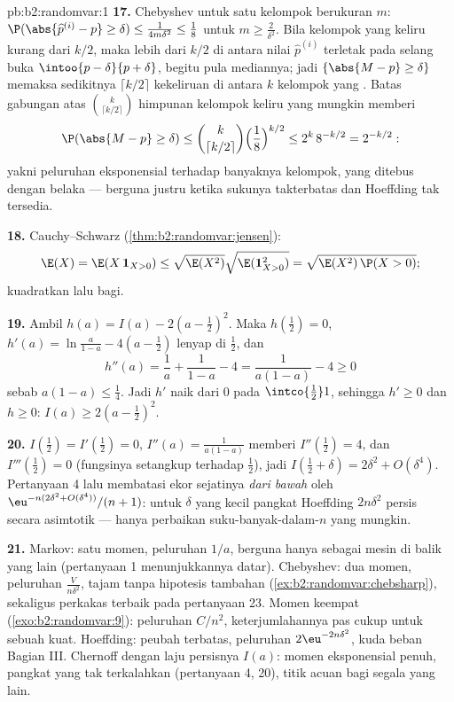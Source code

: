 \begin{solution}{pb:b2:randomvar:1}
\textbf{17.} Chebyshev untuk satu kelompok berukuran $m$: $\P(\abs{
\widehat p^{(i)} - p} \geq \delta) \leq \frac{1}{4m\delta^2}
\leq \frac18$ untuk $m \geq \frac2{\delta^2}$. Bila kelompok yang keliru
kurang dari $k/2$, maka lebih dari $k/2$ di antara nilai
$\widehat p^{(i)}$ terletak pada selang buka $\intoo{p -
\delta}{p + \delta}$, begitu pula mediannya; jadi
$\{\abs{M - p} \geq \delta\}$ memaksa sedikitnya $\lceil
k/2\rceil$ kekeliruan di antara $k$ kelompok yang . Batas
gabungan atas $\binom k{\lceil k/2\rceil}$ himpunan kelompok
keliru yang mungkin memberi
\[
\P(\abs{M - p} \geq \delta)
\leq \binom{k}{\lceil k/2\rceil}
\Bigl(\frac18\Bigr)^{k/2}
\leq 2^k\,8^{-k/2} = 2^{-k/2} :
\]
yakni peluruhan eksponensial terhadap banyaknya kelompok, yang ditebus
dengan  belaka --- berguna justru ketika sukunya
takterbatas dan Hoeffding tak tersedia.

\textbf{18.} Cauchy--Schwarz
(\cref{thm:b2:randomvar:jensen}):
\[
\E(X) = \E(X\,\mathbf 1_{X>0})
\leq \sqrt{\E(X^2)}\sqrt{\E(\mathbf 1_{X>0}^2)}
= \sqrt{\E(X^2)\,\P(X > 0)} ;
\]
kuadratkan lalu bagi.

\textbf{19.} Ambil $h(a) = I(a) - 2(a - \tfrac12)^2$. Maka
$h(\tfrac12) = 0$, $h'(a) = \ln\frac a{1-a} - 4(a -
\tfrac12)$ lenyap di $\tfrac12$, dan
\[
h''(a) = \frac1a + \frac1{1-a} - 4 = \frac{1}{a(1-a)} - 4
\geq 0
\]
sebab $a(1-a) \leq \frac14$. Jadi $h'$ naik dari $0$ pada
$\intco{\frac12}1$, sehingga $h' \geq 0$ dan $h \geq 0$: $I(a)
\geq 2(a - \tfrac12)^2$.

\textbf{20.} $I(\tfrac12) = I'(\tfrac12) = 0$, $I''(a) =
\frac1{a(1-a)}$ memberi $I''(\tfrac12) = 4$, dan $I'''(\tfrac12)
= 0$ (fungsinya setangkup terhadap $\tfrac12$), jadi
$I(\tfrac12 + \delta) = 2\delta^2 + O(\delta^4)$. Pertanyaan 4
lalu membatasi ekor sejatinya \emph{dari bawah} oleh
$\eu^{-n(2\delta^2 + O(\delta^4))}/(n+1)$: untuk $\delta$ yang kecil
pangkat Hoeffding $2n\delta^2$ persis secara asimtotik
--- hanya perbaikan suku-banyak-dalam-$n$ yang mungkin.

\textbf{21.} Markov: satu momen, peluruhan $1/a$, berguna hanya sebagai
mesin di balik yang lain (pertanyaan 1 menunjukkannya datar).
Chebyshev: dua momen, peluruhan $\frac{V}{n\delta^2}$, tajam
tanpa hipotesis tambahan
(\cref{ex:b2:randomvar:chebsharp}), sekaligus perkakas terbaik pada
pertanyaan 23. Momen keempat (\cref{exo:b2:randomvar:9}):
peluruhan $C/n^2$, keterjumlahannya pas cukup untuk sebuah  kuat.
Hoeffding: peubah terbatas, peluruhan $2\eu^{-2n\delta^2}$,
kuda beban Bagian III. Chernoff dengan laju persisnya
$I(a)$: momen eksponensial penuh, pangkat yang tak terkalahkan
(pertanyaan 4, 20), titik acuan bagi segala yang lain.


\end{solution}
